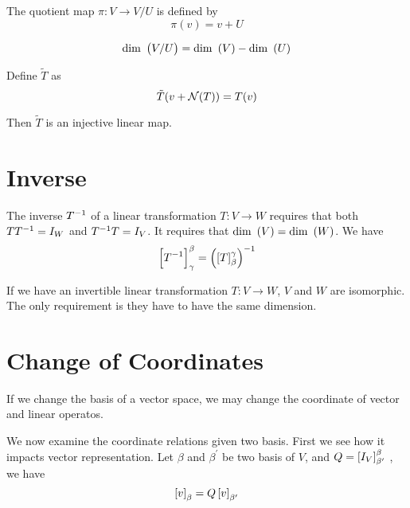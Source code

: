\begin{definition}
    The quotient map $\pi : V \rightarrow V/U$ is defined by 
    \begin{equation}
        \pi(v) = v + U
    \end{equation}
\end{definition}

\begin{theorem}
    \begin{equation}
        \displaystyle \mathrm{dim}~\left( V/U \right) = \displaystyle \mathrm{dim}~\left( V \right) - \displaystyle \mathrm{dim}~\left( U \right)
    \end{equation}    
\end{theorem}

\begin{theorem}
    Define $\tilde{T}$ as 
    \begin{equation}
        \tilde{T}(v + \mathcal{N}(T)) = T(v)
    \end{equation}
    
    Then $\tilde{T}$ is an injective linear map.
\end{theorem}

%
%
%
%


\section{Inverse}
The inverse ${T}^{-1}$ of a linear transformation $T:V \rightarrow W$ requires that both $T {T}^{-1} = I_W$ and ${T}^{-1} T = I_V$. It requires that $\displaystyle \mathrm{dim}~\left( V \right) = \displaystyle \mathrm{dim}~\left( W \right)$. We have
\begin{equation}
    \coordinate{\inverse{T}}_{\gamma}^{\beta} = \inverse{\left( \coordinate{T}_{\beta}^{\gamma} \right)}
\end{equation}

If we have an invertible linear transformation $T:V \rightarrow W$, $V$ and $W$ are isomorphic. The only requirement is they have to have the same dimension.


%
%
%
%

\section{Change of Coordinates}

If we change the basis of a vector space, we may change the coordinate of vector and linear operatos.

We now examine the coordinate relations given two basis. First we see how it impacts vector representation. Let $\beta$ and $\beta^{\prime}$ be two basis of $V$, and $Q=\coordinate{I_V}_{\beta^\prime}^\beta$ , we have 
\begin{equation}
    \coordinate{v}_\beta = Q \coordinate{v}_{\beta^\prime}
\end{equation}

